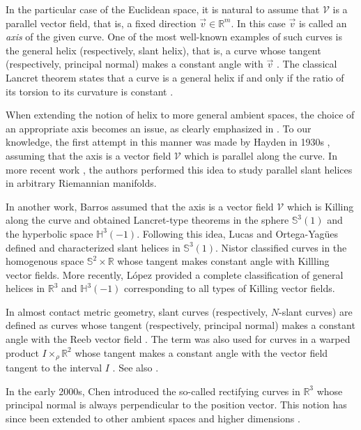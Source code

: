 \documentclass[12pt]{amsart}
\def\r{\mathbb R}
\def\s{\mathbb S}
\def\h{\mathbb H}
\def\v{\mathcal V}
\theoremstyle{definition}
\begin{document}
In the particular case of the Euclidean space, it is natural to assume that $\v$ is a parallel vector field, that is, a fixed direction $\vec{v}\in \r^m$. In this case $\vec{v}$ is called an {\it axis} of the given curve. One of the most well-known examples of such curves is the general helix (respectively, slant helix), that is, a curve whose tangent (respectively, principal normal) makes a constant angle with $\vec{v}$ \cite{it}. The classical Lancret theorem states that a curve is a general helix if and only if the ratio of its torsion to its curvature is constant \cite{lan}.

When extending the notion of helix to more general ambient spaces, the choice of an appropriate axis becomes an issue, as clearly emphasized in \cite{dgd}. To our knowledge, the first attempt in this manner was made by Hayden in 1930s \cite{hay}, assuming that the axis is a vector field $\v$ which is parallel along the curve. In more recent work \cite{dgd}, the authors performed this idea to study parallel slant helices in arbitrary Riemannian manifolds.

In another work, Barros \cite{bar} assumed that the axis is a vector field $\v$ which is Killing along the curve and obtained Lancret-type theorems in the sphere $\s^3(1)$ and the hyperbolic space $\h^3(-1)$. Following this idea, Lucas and Ortega-Yag\"ues \cite{loy2} defined and characterized slant helices in $\s^3(1)$. Nistor \cite{nis} classified curves in the homogenous space $\s^2\times \r$ whose tangent makes constant angle with Killling vector fields. More recently, L\'opez \cite{lo} provided a complete classification of general helices in $\r^3$ and $\h^3(-1)$ corresponding to all types of Killing vector fields.

In almost contact metric geometry, slant curves (respectively, $N$-slant curves) are defined as curves whose tangent (respectively, principal normal) makes a constant angle with the Reeb vector field \cite{agy,ccm,cil}. The term was also used for curves in a warped product $I \times_\rho \r^2$ whose tangent makes a constant angle with the vector field tangent to the interval $I$ \cite{ccra}. See also \cite{cs}.

In the early 2000s, Chen \cite{crc00} introduced the so-called rectifying curves in $\r^3$ whose principal normal is always perpendicular to the position vector. This notion has since been extended to other ambient spaces and higher dimensions \cite{dgd0,ggb,loy01,loy1}.
\end{document}
